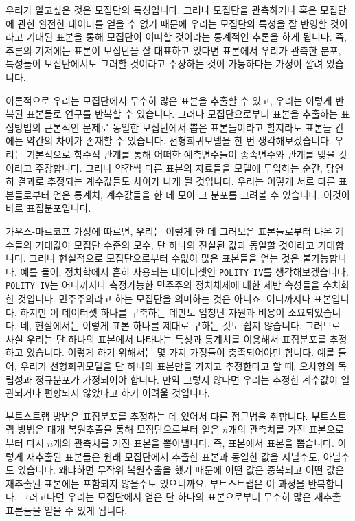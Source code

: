 \documentclass[
]{book}
\begin{document}
우리가 알고싶은 것은 모집단의 특성입니다. 그러나 모집단을 관측하거나 혹은 모집단에 관한 완전한 데이터를 얻을 수 없기 때문에 우리는 모집단의 특성을 잘 반영할 것이라고 기대된 표본을 통해 모집단이 어떠할 것이라는 통계적인 추론을 하게 됩니다. 즉, 추론의 기저에는 표본이 모집단을 잘 대표하고 있다면 표본에서 우리가 관측한 분포, 특성들이 모집단에서도 그러할 것이라고 주장하는 것이 가능하다는 가정이 깔려 있습니다.

이론적으로 우리는 모집단에서 무수히 많은 표본을 추출할 수 있고, 우리는 이렇게 반복된 표본들로 연구를 반복할 수 있습니다. 그러나 모집단으로부터 표본을 추출하는 표집방법의 근본적인 문제로 동일한 모집단에서 뽑은 표본들이라고 할지라도 표본들 간에는 약간의 차이가 존재할 수 있습니다. 선형회귀모델을 한 번 생각해보겠습니다. 우리는 기본적으로 함수적 관계를 통해 어떠한 예측변수들이 종속변수와 관계를 맺을 것이라고 주장합니다. 그러나 약간씩 다른 표본의 자료들을 모델에 투입하는 순간, 당연히 결과로 추정되는 계수값들도 차이가 나게 될 것입니다. 우리는 이렇게 서로 다른 표본들로부터 얻은 통계치, 계수값들을 한 데 모아 그 분포를 그려볼 수 있습니다. 이것이 바로 표집분포입니다.

가우스-마르코프 가정에 따르면, 우리는 이렇게 한 데 그러모은 표본들로부터 나온 계수들의 기대값이 모집단 수준의 모수, 단 하나의 진실된 값과 동일할 것이라고 기대합니다. 그러나 현실적으로 모집단으로부터 수없이 많은 표본들을 얻는 것은 불가능합니다. 예를 들어, 정치학에서 흔히 사용되는 데이터셋인 \texttt{POLITY\ IV}를 생각해보겠습니다. \texttt{POLITY\ IV}는 어디까지나 측정가능한 민주주의 정치체제에 대한 제반 속성들을 수치화한 것입니다. 민주주의라고 하는 모집단을 의미하는 것은 아니죠. 어디까지나 표본입니다. 하지만 이 데이터셋 하나를 구축하는 데만도 엄청난 자원과 비용이 소요되었습니다. 네, 현실에서는 이렇게 표본 하나를 제대로 구하는 것도 쉽지 않습니다. 그러므로 사실 우리는 단 하나의 표본에서 나타나는 특성과 통계치를 이용해서 표집분포를 추정하고 있습니다. 이렇게 하기 위해서는 몇 가지 가정들이 충족되어야만 합니다. 예를 들어, 우리가 선형회귀모델을 단 하나의 표본만을 가지고 추정한다고 할 때, 오차항의 독립성과 정규분포가 가정되어야 합니다. 만약 그렇지 않다면 우리는 추정한 계수값이 일관되거나 편향되지 않았다고 하기 어려울 것입니다.

부트스트랩 방법은 표집분포를 추정하는 데 있어서 다른 접근법을 취합니다. 부트스트랩 방법은 대개 복원추출을 통해 모집단으로부터 얻은 \(n\)개의 관측치를 가진 표본으로부터 다시 \(n\)개의 관측치를 가진 표본을 뽑아냅니다. 즉, 표본에서 표본을 뽑습니다. 이렇게 재추출된 표본들은 원래 모집단에서 추출한 표본과 동일한 값을 지닐수도, 아닐수도 있습니다. 왜냐하면 무작위 복원추출을 했기 때문에 어떤 값은 중복되고 어떤 값은 재추출된 표본에는 포함되지 않을수도 있으니까요. 부트스트랩은 이 과정을 반복합니다. 그러고나면 우리는 모집단에서 얻은 단 하나의 표본으로부터 무수히 많은 재추출 표본들을 얻을 수 있게 됩니다.
\end{document}

